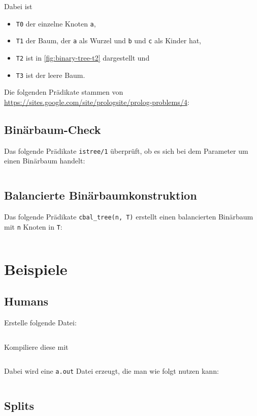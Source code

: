 Dabei ist 
\begin{itemize}
    \item \texttt{T0} der einzelne Knoten \texttt{a},
    \item \texttt{T1} der Baum, der \texttt{a} als Wurzel und \texttt{b} und 
          \texttt{c} als Kinder hat,
    \item \texttt{T2} ist in \cref{fig:binary-tree-t2} dargestellt und
    \item \texttt{T3} ist der leere Baum.
\end{itemize}

Die folgenden Prädikate stammen von \url{https://sites.google.com/site/prologsite/prolog-problems/4}:

\subsection{Binärbaum-Check}
Das folgende Prädikate \texttt{istree/1} überprüft, ob es sich bei dem Parameter
um einen Binärbaum handelt:

\inputminted[numbersep=5pt, tabsize=4]{prolog}{scripts/prolog/istree.pl}

\subsection{Balancierte Binärbaumkonstruktion}
Das folgende Prädikate \texttt{cbal\_tree(n, T)} erstellt einen balancierten 
Binärbaum mit \texttt{n} Knoten in \texttt{T}:

\inputminted[numbersep=5pt, tabsize=4]{prolog}{scripts/prolog/balancedtreeconstruction.pl}

\section{Beispiele}
\subsection{Humans}
Erstelle folgende Datei:
\inputminted[linenos, numbersep=5pt, tabsize=4, frame=lines, label=human.pro]{prolog}{scripts/prolog/human.pro}

Kompiliere diese mit
\inputminted[numbersep=5pt, tabsize=4]{bash}{scripts/prolog/human.sh}

Dabei wird eine \texttt{a.out} Datei erzeugt, die man wie folgt
nutzen kann:
\inputminted[numbersep=5pt, tabsize=4]{bash}{scripts/prolog/human-2.sh}

\subsection{Splits}
\inputminted[linenos, numbersep=5pt, tabsize=4, frame=lines, label=splits.pl]{prolog}{scripts/prolog/splits.pl}

